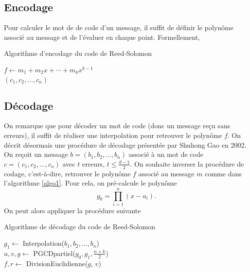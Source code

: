 \documentclass{article}
\theoremstyle{definition}
\theoremstyle{remark}
\begin{document}
\subsection{Encodage}
\label{subsec:rs-enc}

Pour calculer le mot de de code d'un message, il suffit de définir le polynôme associé au message et de l'évaluer en chaque point. Formellement,

\begin{algorithm}
\label{algo1}
\caption{Algorithme d'encodage du code de Reed-Solomon}


$f \gets m_{1} + m_2x + \cdots + m_kx^{k-1}$ \\
\Retour $(c_{1}, c_2, \dots, c_n)$
\end{algorithm}

\subsection{Décodage}
\label{subsec:rs-dec}

On remarque que pour décoder un mot de code (donc un message reçu sans erreurs), il suffit de réaliser une interpolation pour retrouver le polynôme $f$.
On décrit désormais une procédure de décodage présentée par Shuhong Gao en 2002. On reçoit un message $b = (b_{1}, b_2, \dots, b_n)$ associé à un mot de code $c = (c_{1}, c_2, \dots, c_n)$ avec $t$ erreurs, $t \leq \frac{d-1}{2}$. On souhaite inverser la procédure de codage, c'est-à-dire, retrouver le polynôme $f$ associé au message $m$ comme dans l'algorithme \ref{algo1}. Pour cela, on pré-calcule le polynôme
\[ g_{0} = \prod_{i = 1}^{n} (x - a_i). \]
On peut alors appliquer la procédure suivante

\begin{algorithm}[H]
\label{algo2}
\caption{Algorithme de décodage du code de Reed-Solomon \cite{Gao2003}}
$g_{1} \gets$ Interpolation($b_{1}, b_2, \dots, b_n$) \\
$u, v, g \gets$ PGCDpartiel($g_{0}, g_{1}, \frac{n+k}{2}$) \\
$f, r \gets$ DivisionEuclidienne($g$, $v$) \\
\end{algorithm}
\end{document}

